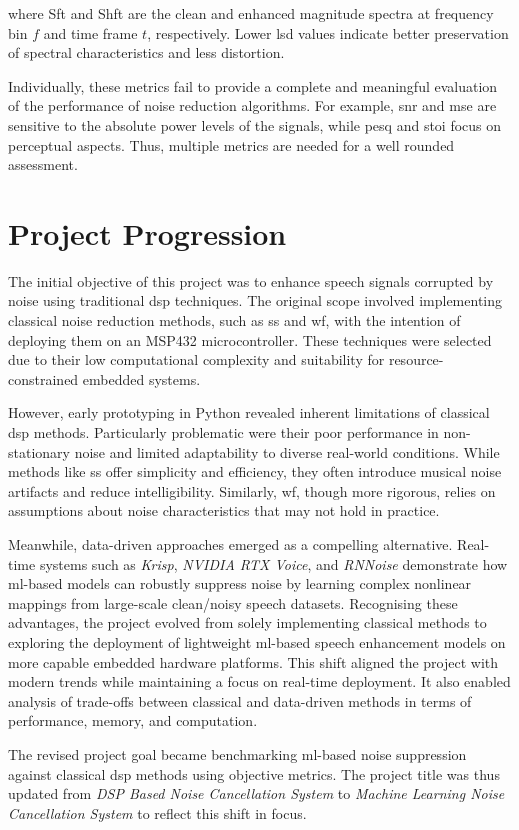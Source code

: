 where \gls{Sft} and \gls{Shft} are the clean and enhanced magnitude spectra at frequency bin \( f \) and time frame \( t \), respectively. Lower \gls{lsd} values indicate better preservation of spectral characteristics and less distortion.

\vspace{2em}
Individually, these metrics fail to provide a complete and meaningful evaluation of the performance of noise reduction algorithms. For example, \gls{snr} and \gls{mse} are sensitive to the absolute power levels of the signals, while \gls{pesq} and \gls{stoi} focus on perceptual aspects. Thus, multiple metrics are needed for a well rounded assessment.


\section{Project Progression}
\label{sec:project_progression}

The initial objective of this project was to enhance speech signals corrupted by noise using traditional \gls{dsp} techniques. The original scope involved implementing classical noise reduction methods, such as \gls{ss} and \gls{wf}, with the intention of deploying them on an MSP432 microcontroller. These techniques were selected due to their low computational complexity and suitability for resource-constrained embedded systems.

However, early prototyping in Python revealed inherent limitations of classical \gls{dsp} methods. Particularly problematic were their poor performance in non-stationary noise and limited adaptability to diverse real-world conditions. While methods like \gls{ss} offer simplicity and efficiency, they often introduce musical noise artifacts and reduce intelligibility. Similarly, \gls{wf}, though more rigorous, relies on assumptions about noise characteristics that may not hold in practice.

Meanwhile, data-driven approaches emerged as a compelling alternative. Real-time systems such as \textit{Krisp}, \textit{NVIDIA RTX Voice}, and \textit{RNNoise} demonstrate how \gls{ml}-based models can robustly suppress noise by learning complex nonlinear mappings from large-scale clean/noisy speech datasets. Recognising these advantages, the project evolved from solely implementing classical methods to exploring the deployment of lightweight \gls{ml}-based speech enhancement models on more capable embedded hardware platforms. This shift aligned the project with modern trends while maintaining a focus on real-time deployment. It also enabled analysis of trade-offs between classical and data-driven methods in terms of performance, memory, and computation.

The revised project goal became benchmarking \gls{ml}-based noise suppression against classical \gls{dsp} methods using objective metrics. The project title was thus updated from \textit{DSP Based Noise Cancellation System} to \textit{Machine Learning Noise Cancellation System} to reflect this shift in focus.